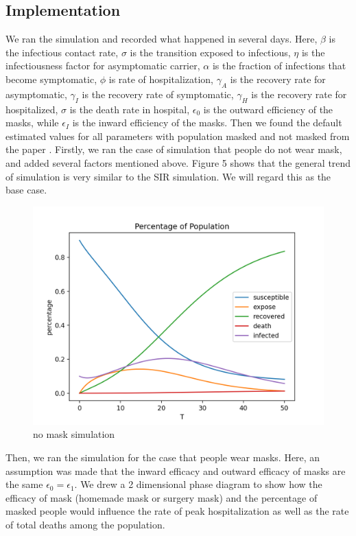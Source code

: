 \documentclass{article}
\begin{document}
 \subsection{Implementation}

 We ran the simulation and recorded what happened in several days. Here, $\beta $ is the infectious contact rate, $\sigma $ is the transition exposed to infectious, $\eta $ is the infectiousness factor for asymptomatic carrier, $\alpha$ is the fraction of infections that become symptomatic, $\phi$ is rate of hospitalization, $\gamma_{A}$ is the recovery rate for asymptomatic, $\gamma_{I}$ is the recovery rate of  symptomatic, $\gamma_{H}$ is the recovery rate for hospitalized, $\sigma$ is the death rate in hospital, $\epsilon_{0}$ is the outward efficiency of the masks, while $\epsilon_{I}$ is the inward efficiency of the masks. Then we found the default estimated values for all parameters with population masked and not masked from the paper \cite{Steff2020mask}. Firstly, we ran the case of simulation that people do not wear mask, and added several factors mentioned above. Figure 5 shows that the general trend of simulation is very similar to the SIR simulation. We will regard this as the base case. 


 \begin{figure}[htp]
 \centering
 \includegraphics[width=.3\textwidth]{masksimulation.png}
 \caption{no mask simulation}
 \label{fig:figure5}
 \end{figure}

Then, we ran the simulation for the case that people wear masks.
Here, an assumption was made that the inward efficacy and outward efficacy of masks are the same $\epsilon_{0} = \epsilon_{1}$. We drew a 2 dimensional phase diagram to show how the efficacy of mask (homemade mask or surgery mask) and the percentage of masked people would influence the rate of peak hospitalization as well as the rate of total deaths among the population. 
\end{document}
